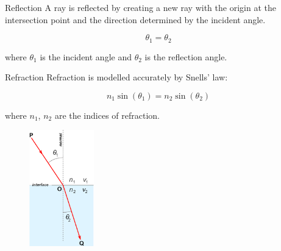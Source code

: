 \documentclass[aspectratio=43,t]{beamer}
\begin{document}
		\begin{frame}[fragile]{Reflection}
		A ray is reflected by creating a new ray with the origin at the intersection
		point and the direction determined by the incident angle.

		\bigskip

		\begin{equation*}
			\theta_1 = \theta_2
		\end{equation*}

		\bigskip

		where $\theta_1$ is the incident angle and $\theta_2$ is the reflection angle.
    \end{frame}

		\begin{frame}[fragile]{Refraction}
		Refraction is modelled accurately by Snells' law:

		\begin{equation*}
			n_1 \sin (\theta_1) = n_2 \sin (\theta_2)
		\end{equation*}

		where $n_1$, $n_2$ are the indices of refraction.

		\begin{figure}
		\centering
		\includegraphics[width=0.25\textwidth]{images/snell.png}
		\end{figure}

    \end{frame}
\end{document}
